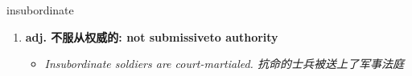 
\begin{frame}
{\huge insubordinate}
\begin{center}
\begin{enumerate}\Large
  \item \textbf{adj. 不服从权威的: not submissiveto authority}
  \begin{itemize}
    \item \em{\Large{Insubordinate soldiers are court-martialed. 抗命的士兵被送上了军事法庭}}
  \end{itemize}
\end{enumerate}
\end{center}
\end{frame}
